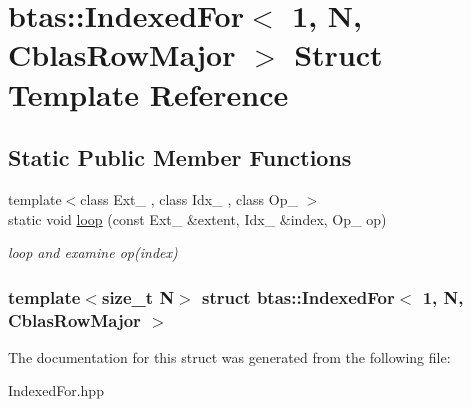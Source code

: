 \hypertarget{structbtas_1_1_indexed_for_3_011_00_01_n_00_01_cblas_row_major_01_4}{
\section{btas::IndexedFor$<$ 1, N, CblasRowMajor $>$ Struct Template Reference}
\label{structbtas_1_1_indexed_for_3_011_00_01_n_00_01_cblas_row_major_01_4}
}
\subsection*{Static Public Member Functions}
\begin{DoxyCompactItemize}
\item 
\hypertarget{structbtas_1_1_indexed_for_3_011_00_01_n_00_01_cblas_row_major_01_4_ab5871e5228241cf46122c8e6a9a4011e}{
{\footnotesize template$<$class Ext\_\- , class Idx\_\- , class Op\_\- $>$ }\\static void \hyperlink{structbtas_1_1_indexed_for_3_011_00_01_n_00_01_cblas_row_major_01_4_ab5871e5228241cf46122c8e6a9a4011e}{loop} (const Ext\_\- \&extent, Idx\_\- \&index, Op\_\- op)}
\label{structbtas_1_1_indexed_for_3_011_00_01_n_00_01_cblas_row_major_01_4_ab5871e5228241cf46122c8e6a9a4011e}

\begin{DoxyCompactList}\small\item\em loop and examine op(index) \item\end{DoxyCompactList}\end{DoxyCompactItemize}
\subsubsection*{template$<$size\_\-t N$>$ struct btas::IndexedFor$<$ 1, N, CblasRowMajor $>$}



The documentation for this struct was generated from the following file:\begin{DoxyCompactItemize}
\item 
IndexedFor.hpp\end{DoxyCompactItemize}
